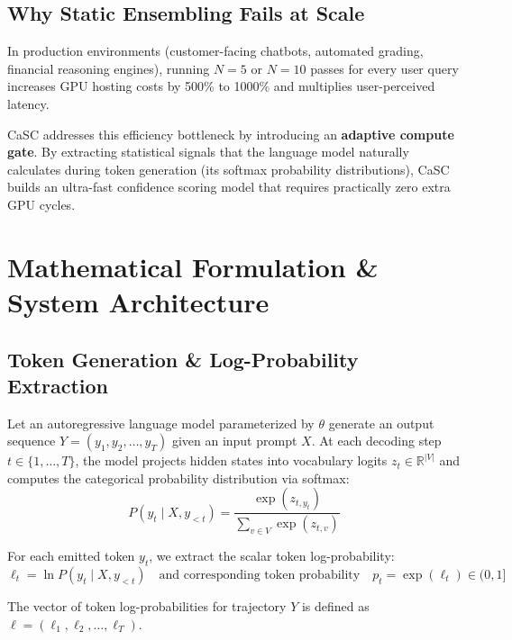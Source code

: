 \documentclass[11pt,a4paper]{article}
\begin{document}
\subsection{Why Static Ensembling Fails at Scale}
In production environments (customer-facing chatbots, automated grading, financial reasoning engines), running $N=5$ or $N=10$ passes for every user query increases GPU hosting costs by 500\% to 1000\% and multiplies user-perceived latency. 

CaSC addresses this efficiency bottleneck by introducing an \textbf{adaptive compute gate}. By extracting statistical signals that the language model naturally calculates during token generation (its softmax probability distributions), CaSC builds an ultra-fast confidence scoring model that requires practically zero extra GPU cycles.

\section{Mathematical Formulation \& System Architecture}

\subsection{Token Generation \& Log-Probability Extraction}
Let an autoregressive language model parameterized by $\theta$ generate an output sequence $Y = (y_1, y_2, \dots, y_T)$ given an input prompt $X$. At each decoding step $t \in \{1, \dots, T\}$, the model projects hidden states into vocabulary logits $z_t \in \mathbb{R}^{|V|}$ and computes the categorical probability distribution via softmax:
\begin{equation}
    P(y_t \mid X, y_{<t}) = \frac{\exp(z_{t, y_t})}{\sum_{v \in V} \exp(z_{t, v})}
\end{equation}

For each emitted token $y_t$, we extract the scalar token log-probability:
\begin{equation}
    \ell_t = \ln P(y_t \mid X, y_{<t}) \quad \text{and corresponding token probability} \quad p_t = \exp(\ell_t) \in (0, 1]
\end{equation}

The vector of token log-probabilities for trajectory $Y$ is defined as $\boldsymbol{\ell} = (\ell_1, \ell_2, \dots, \ell_T)$.
\end{document}

